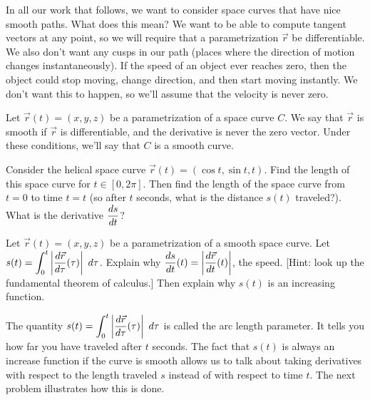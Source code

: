 In all our work that follows, we want to consider space curves that have nice smooth paths.  What does this mean?  We want to be able to compute tangent vectors at any point, so we will require that a parametrization $\vec r$ be differentiable.  We also don't want any cusps in our path (places where the direction of motion changes instantaneously). If the speed of an object ever reaches zero, then the object could stop moving, change direction, and then start moving instantly. We don't want this to happen, so we'll assume that the velocity is never zero.
\begin{definition}
 Let $\vec r(t)=(x,y,z)$ be a parametrization of a space curve $C$. We say that $\vec r$ is smooth if $\vec r$ is differentiable, and the derivative is never the zero vector. Under these conditions, we'll say that $C$ is a smooth curve. 
\end{definition}

\begin{problem}%
%
 Consider the helical space curve $\vec r(t)=(\cos t, \sin t, t)$. Find the length of this space curve for $t\in[0,2\pi]$.  Then find the length of the space curve from $t=0$ to time $t=t$ (so after $t$ seconds, what is the distance $s(t)$ traveled?). What is the derivative $\displaystyle\frac{ds}{dt}$?
\end{problem}

\begin{problem}\label{fundamental theorem of calculus as it applies to arc length parameter}%
 Let $\vec r(t)=(x,y,z)$ be a parametrization of a smooth space curve. Let $\displaystyle s(t)=\int_0^t \left|\frac {d\vec r}{d\tau}(\tau) \right|\ d\tau$.  Explain why $\displaystyle\frac{ds}{dt}(t) = \left|\frac {d\vec r}{dt}(t) \right|$, the speed. [Hint: look up the fundamental theorem of calculus.] Then explain why $s(t)$ is an increasing function.
\end{problem}

The quantity $\displaystyle s(t)=\int_0^t \left|\frac {d\vec r}{d\tau}(\tau) \right|\ d\tau$ is called the arc length parameter.  It tells you how far you have traveled after $t$ seconds.  The fact that $s(t)$ is always an increase function if the curve is smooth allows us to talk about taking derivatives with respect to the length traveled $s$ instead of with respect to time $t$.  The next problem illustrates how this is done.

